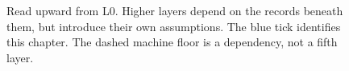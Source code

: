 \begin{figure}[H]
\centering
{}
\caption{Read upward from L0. Higher layers depend on the records beneath them, but introduce their own assumptions. The blue tick identifies this chapter. The dashed machine floor is a dependency, not a fifth layer.}
\label{fig:swk-stack-map}
\end{figure}
